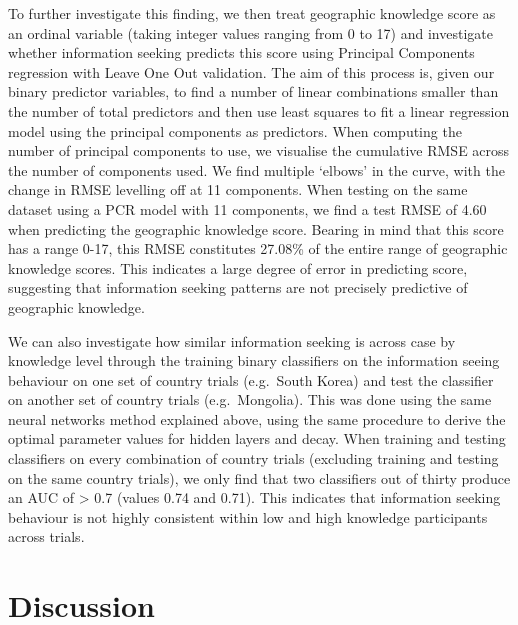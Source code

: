 \documentclass[a4paper, nobind]{templates/ociamthesis}
\begin{document}
To further investigate this finding, we then treat geographic knowledge score as an ordinal variable (taking integer values ranging from 0 to 17) and investigate whether information seeking predicts this score using Principal Components regression with Leave One Out validation. The aim of this process is, given our binary predictor variables, to find a number of linear combinations smaller than the number of total predictors and then use least squares to fit a linear regression model using the principal components as predictors. When computing the number of principal components to use, we visualise the cumulative RMSE across the number of components used. We find multiple `elbows' in the curve, with the change in RMSE levelling off at 11 components. When testing on the same dataset using a PCR model with 11 components, we find a test RMSE of 4.60 when predicting the geographic knowledge score. Bearing in mind that this score has a range 0-17, this RMSE constitutes 27.08\% of the entire range of geographic knowledge scores. This indicates a large degree of error in predicting score, suggesting that information seeking patterns are not precisely predictive of geographic knowledge.

We can also investigate how similar information seeking is across case by knowledge level through the training binary classifiers on the information seeing behaviour on one set of country trials (e.g.~South Korea) and test the classifier on another set of country trials (e.g.~Mongolia). This was done using the same neural networks method explained above, using the same procedure to derive the optimal parameter values for hidden layers and decay. When training and testing classifiers on every combination of country trials (excluding training and testing on the same country trials), we only find that two classifiers out of thirty produce an AUC of \textgreater{} 0.7 (values 0.74 and 0.71). This indicates that information seeking behaviour is not highly consistent within low and high knowledge participants across trials.

\hypertarget{discussion-1}{%
\section*{Discussion}\label{discussion-1}}
\end{document}
